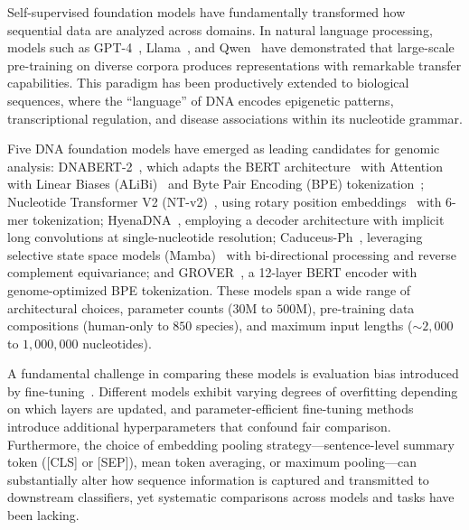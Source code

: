 \documentclass[11pt]{article}
\begin{document}
Self-supervised foundation models have fundamentally transformed how sequential data are analyzed across domains. In natural language processing, models such as GPT-4~\citep{achiam2023gpt4}, Llama~\citep{touvron2023llama}, and Qwen~\citep{yang2024qwen} have demonstrated that large-scale pre-training on diverse corpora produces representations with remarkable transfer capabilities. This paradigm has been productively extended to biological sequences, where the ``language'' of DNA encodes epigenetic patterns, transcriptional regulation, and disease associations within its nucleotide grammar.

Five DNA foundation models have emerged as leading candidates for genomic analysis: DNABERT-2~\citep{zhou2024dnabert2}, which adapts the BERT architecture~\citep{devlin2019bert} with Attention with Linear Biases (ALiBi)~\citep{press2022alibi} and Byte Pair Encoding (BPE) tokenization~\citep{sennrich2016bpe}; Nucleotide Transformer V2 (NT-v2)~\citep{dallatorre2023nucleotide}, using rotary position embeddings~\citep{su2024roformer} with 6-mer tokenization; HyenaDNA~\citep{nguyen2024hyenadna}, employing a decoder architecture with implicit long convolutions at single-nucleotide resolution; Caduceus-Ph~\citep{schiff2024caduceus}, leveraging selective state space models (Mamba)~\citep{gu2024mamba} with bi-directional processing and reverse complement equivariance; and GROVER~\citep{sanabria2024grover}, a 12-layer BERT encoder with genome-optimized BPE tokenization. These models span a wide range of architectural choices, parameter counts ($30$M to $500$M), pre-training data compositions (human-only to $850$ species), and maximum input lengths (${\sim}2{,}000$ to $1{,}000{,}000$ nucleotides).

A fundamental challenge in comparing these models is evaluation bias introduced by fine-tuning~\citep{hu2022lora,houlsby2019adapter}. Different models exhibit varying degrees of overfitting depending on which layers are updated, and parameter-efficient fine-tuning methods introduce additional hyperparameters that confound fair comparison. Furthermore, the choice of embedding pooling strategy---sentence-level summary token ([CLS] or [SEP]), mean token averaging, or maximum pooling---can substantially alter how sequence information is captured and transmitted to downstream classifiers, yet systematic comparisons across models and tasks have been lacking.
\end{document}
